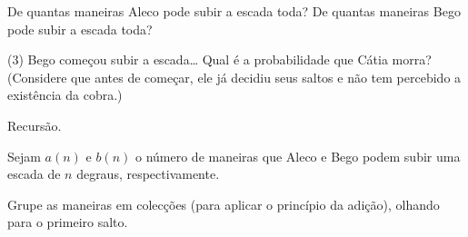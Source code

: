  De quantas maneiras Aleco pode subir a escada toda?
 De quantas maneiras Bego pode subir a escada toda?
\item{(3)} Bego começou subir a escada\dots{}
Qual é a probabilidade que Cátia morra?
(Considere que antes de começar,
ele já decidiu seus saltos e não tem percebido a existência da cobra.)

\hint Recursão.

\hint
Sejam $a(n)$ e $b(n)$ o número de maneiras que Aleco e Bego
podem subir uma escada de $n$ degraus, respectivamente.

\hint
Grupe as maneiras em colecções (para aplicar o princípio da adição),
olhando para o primeiro salto.

